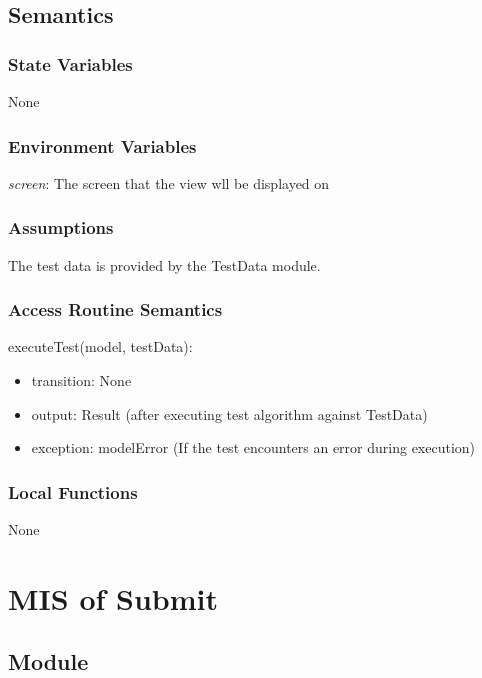 \documentclass[12pt, titlepage]{article}
\begin{document}
\subsection{Semantics}

\subsubsection{State Variables}

None

\subsubsection{Environment Variables}

\textit{screen}: The screen that the view wll be displayed on

\subsubsection{Assumptions}

The test data is provided by the TestData module.

\subsubsection{Access Routine Semantics}

\noindent executeTest(model, testData):
\begin{itemize}
\item transition: None
\item output: Result  (after executing test algorithm against TestData)
\item exception: modelError (If the test encounters an error during execution)
\end{itemize}

\subsubsection{Local Functions}

None

\newpage

\section{MIS of Submit} \label{SubmitModule}

\subsection{Module}
\end{document}
